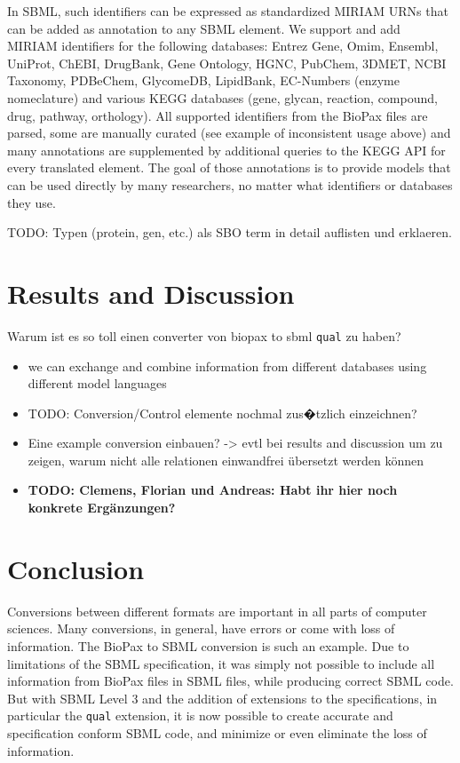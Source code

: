 \documentclass{bioinfo}
\newcommand{\qual}{\texttt{qual}}
\begin{document}
\begin{methods}
In SBML, such identifiers can be expressed as standardized MIRIAM URNs that can be added as annotation to any SBML element.
We support and add MIRIAM identifiers for the following databases: Entrez Gene, Omim, Ensembl, UniProt, ChEBI, DrugBank, Gene Ontology, HGNC, PubChem, 3DMET, NCBI Taxonomy, PDBeChem, GlycomeDB, LipidBank, EC-Numbers (enzyme nomeclature) and various KEGG databases (gene, glycan, reaction, compound, drug, pathway, orthology).
All supported identifiers from the BioPax files are parsed, some are manually curated (see example of inconsistent usage above) and many annotations are supplemented by additional queries to the KEGG API for every translated element.
The goal of those annotations is to provide models that can be used directly by many researchers, no matter what identifiers or databases they use.

TODO: Typen (protein, gen, etc.) als SBO term in detail auflisten und erklaeren.

\end{methods}


\section{Results and Discussion}
Warum ist es so toll einen converter von biopax to sbml \qual{} zu haben?
\begin{itemize}
\item we can exchange and combine information from different databases using different model languages
\item TODO: Conversion/Control elemente nochmal zus�tzlich einzeichnen?
\item Eine example conversion einbauen? -> evtl bei results and discussion um zu zeigen, warum nicht alle relationen einwandfrei \"ubersetzt werden k\"onnen
    \item \textbf{TODO: Clemens, Florian und Andreas: Habt ihr hier noch konkrete Erg\"anzungen?}
\end{itemize}

\section{Conclusion}
Conversions between different formats are important in all parts of computer sciences. Many conversions, in general, have errors or come with loss of information. The BioPax to SBML conversion is such an example. Due to limitations of the SBML specification, it was simply not possible to include all information from BioPax files in SBML files, while producing correct SBML code. But with SBML Level 3 and the addition of extensions to the specifications, in particular the \qual{} extension, it is now possible to create accurate and specification conform SBML code, and minimize or even eliminate the loss of information.
\end{document}
